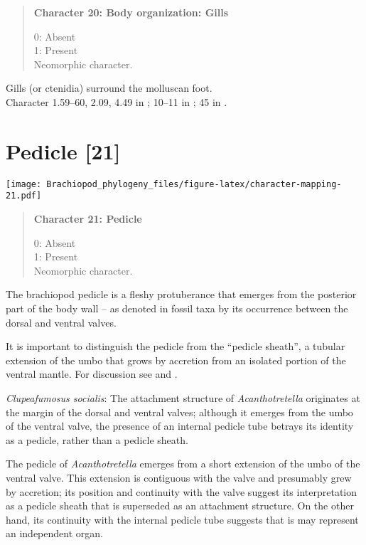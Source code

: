 \documentclass[openany]{book}
\theoremstyle{definition}
\theoremstyle{definition}
\theoremstyle{definition}
\theoremstyle{remark}
\begin{document}
\begin{quote}
\textbf{Character 20: Body organization: Gills}

0: Absent\\
1: Present\\
Neomorphic character.
\end{quote}

Gills (or ctenidia) surround the molluscan foot.\\
Character 1.59--60, 2.09, 4.49 in \citet{SPS1996}; 10--11 in
\citet{Haszprunar2000}; 45 in \citet{Sutton2012}.

\section{Pedicle {[}21{]}}\label{pedicle-21}

\texttt{[image: Brachiopod\_phylogeny\_files/figure-latex/character-mapping-21.pdf]}

\begin{quote}
\textbf{Character 21: Pedicle}

0: Absent\\
1: Present\\
Neomorphic character.
\end{quote}

The brachiopod pedicle is a fleshy protuberance that emerges from the
posterior part of the body wall -- as denoted in fossil taxa by its
occurrence between the dorsal and ventral valves.

It is important to distinguish the pedicle from the ``pedicle sheath'',
a tubular extension of the umbo that grows by accretion from an isolated
portion of the ventral mantle. For discussion see
\citet{Holmer2018Theattachment} and \citet{Bassett2017Earliestontogeny}.

\hypertarget{Clupeafumosus_socialis-coding-21}{}
\emph{Clupeafumosus socialis}: The attachment structure of
\emph{Acanthotretella} originates at the margin of the dorsal and
ventral valves; although it emerges from the umbo of the ventral valve,
the presence of an internal pedicle tube betrays its identity as a
pedicle, rather than a pedicle sheath.

The pedicle of \emph{Acanthotretella} emerges from a short extension of
the umbo of the ventral valve. This extension is contiguous with the
valve and presumably grew by accretion; its position and continuity with
the valve suggest its interpretation as a pedicle sheath that is
superseded as an attachment structure. On the other hand, its continuity
with the internal pedicle tube suggests that is may represent an
independent organ.
\end{document}
